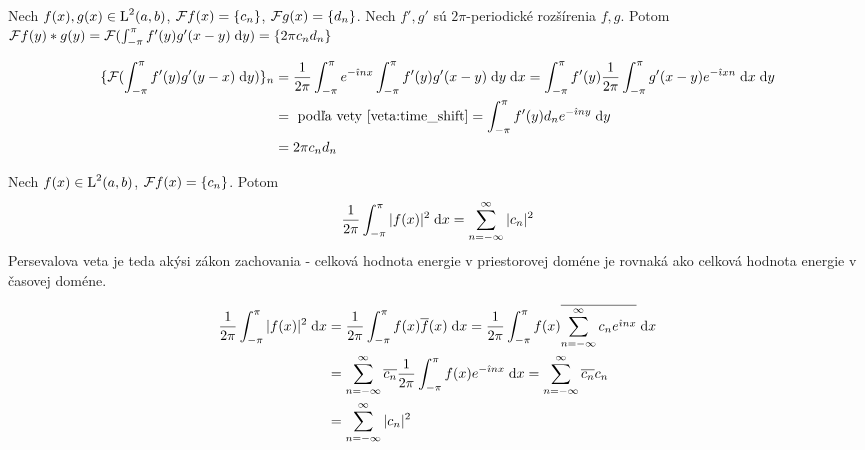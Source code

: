 \begin{veta}[O konvolúcii]
Nech $f(x),g(x) \in \mbox{L}^2(a,b)$, $\mathcal{F}{f(x)} = \{c_n\}$,
$\mathcal{F}{g(x)} = \{d_n\}$. Nech $f', g'$ sú $2\pi$-periodické
rozšírenia $f,g$. Potom $\mathcal{F} f(y)*g(y) = 
    \mathcal{F} (\int_{-\pi}^{\pi} f'(y)g'(x-y) \; \mathrm{d} y) = \{ 2\pi c_n d_n \}$

\end{veta}
\begin{dokaz}
    \begin{equation*}
    \begin{split}
        \{\mathcal{F} (\int_{-\pi}^{\pi} f'(y)g'(y-x) \; \mathrm{d} y)\}_n 
        &= \frac{1}{2\pi} \int_{-\pi}^{\pi} e^{-\hat{\imath} n x}
            \int_{-\pi}^{\pi} f'(y)g'(x-y) \; \mathrm{d} y \; \mathrm{d} x 
         = \int_{-\pi}^{\pi} f'(y) \frac{1}{2\pi} \int_{-\pi}^{\pi}  g'(x-y) e^{-\hat{\imath} x n}
         \; \mathrm{d} x \; \mathrm{d} y \\
        &=\text{ podľa vety \ref{veta:time_shift}}=
          \int_{-\pi}^{\pi} f'(y) d_{n} e^{-\hat{\imath} n y} \; \mathrm{d} y \\
        &= 2\pi c_n d_n
    \end{split}
    \end{equation*}
\end{dokaz}

\begin{veta}
 Nech $f(x) \in \mbox{L}^2(a,b)$, $\mathcal{F} f(x) = \{ c_n\}$. Potom
 \begin{equation}
   \frac{1}{2\pi} \int_{-\pi}^{\pi} |f(x)|^2 \; \mathrm{d} x = \sum_{n=-\infty}^{\infty} |c_n|^2
 \end{equation}
 Persevalova veta je teda akýsi zákon zachovania - celková hodnota
 energie v priestorovej doméne je rovnaká ako celková hodnota energie
 v časovej doméne.
\end{veta}
\begin{dokaz}
    \begin{equation*}
    \begin{split}
        \frac{1}{2\pi} \int_{-\pi}^{\pi} |f(x)|^2 \; \mathrm{d} x 
          &= \frac{1}{2\pi} \int_{-\pi}^{\pi} f(x) \overline{f}(x) \; \mathrm{d} x 
           = \frac{1}{2\pi} \int_{-\pi}^{\pi} f(x) 
            \overline{ \sum_{n=-\infty}^{\infty} c_n e^{\hat{\imath} n x} } \; \mathrm{d} x \\
          &= \sum_{n=-\infty}^{\infty} \overline{c_n} \frac{1}{2\pi}
                \int_{-\pi}^{\pi} f(x) e^{-\hat{\imath} n x} \; \mathrm{d} x
            = \sum_{n=-\infty}^{\infty} \overline{c_n} c_n \\
          &= \sum_{n=-\infty}^{\infty} |c_n|^2
    \end{split}
    \end{equation*}
\end{dokaz}

\nocite{properties_series}
\nocite{bracewell}
